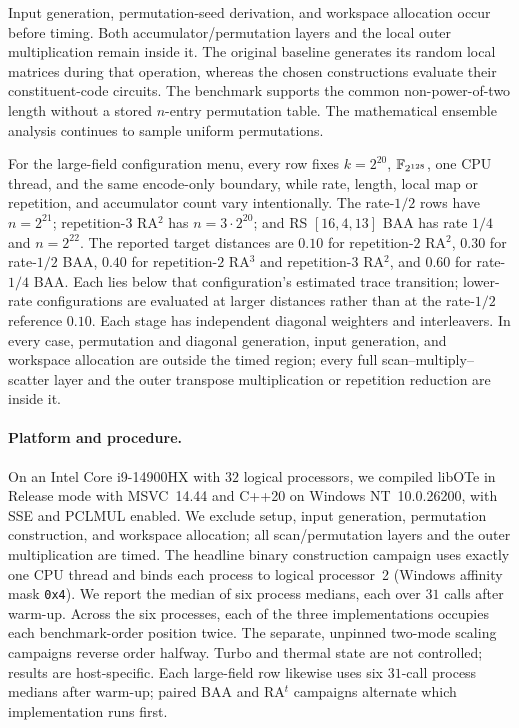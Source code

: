 Input generation, permutation-seed derivation, and workspace allocation occur before
timing.  Both accumulator/permutation layers and the local outer multiplication
remain inside it.  The original baseline generates its random local matrices
during that operation, whereas the chosen constructions evaluate their
constituent-code circuits.  The benchmark supports the common non-power-of-two
length without a stored $n$-entry permutation table.  The mathematical ensemble
analysis continues to sample uniform permutations.

For the large-field configuration menu, every row fixes $k=2^{20}$,
$\mathbb F_{2^{128}}$, one CPU thread, and the same encode-only boundary, while rate,
length, local map or repetition, and accumulator count vary intentionally.  The
rate-$1/2$ rows have $n=2^{21}$; repetition-$3$ RA$^2$ has
$n=3\cdot2^{20}$; and RS $[16,4,13]$ BAA has rate $1/4$ and $n=2^{22}$.
The reported target distances are $0.10$ for repetition-$2$ RA$^2$, $0.30$
for rate-$1/2$ BAA, $0.40$ for repetition-$2$ RA$^3$ and repetition-$3$
RA$^2$, and $0.60$ for rate-$1/4$ BAA.  Each lies below that configuration's
estimated trace transition; lower-rate configurations are evaluated at larger
distances rather than at the rate-$1/2$ reference $0.10$.
Each stage has independent diagonal weighters and interleavers.  In every case,
permutation and diagonal generation, input generation, and workspace allocation
are outside the timed region; every full scan--multiply--scatter layer and the
outer transpose multiplication or repetition reduction are inside it.

\paragraph{Platform and procedure.}
On an Intel Core i9-14900HX with $32$ logical processors, we compiled libOTe in
Release mode with MSVC~14.44 and C++20 on Windows NT~10.0.26200, with SSE and
 PCLMUL enabled.  We exclude setup, input generation, permutation construction,
 and workspace allocation; all scan/permutation layers and the outer
 multiplication are timed.  The headline binary construction campaign uses
exactly one CPU thread and binds each process to logical processor~2 (Windows
affinity mask \texttt{0x4}).  We report the median of six process medians, each
over $31$ calls after warm-up.  Across the six processes, each of the three
implementations occupies each benchmark-order position twice.  The separate,
unpinned two-mode scaling campaigns reverse order halfway.  Turbo and thermal
state are not controlled; results are host-specific.
Each large-field row likewise uses six $31$-call process medians after warm-up;
paired BAA and RA$^t$ campaigns alternate which implementation runs first.




